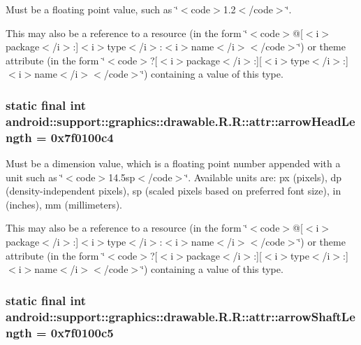 Must be a floating point value, such as \char`\"{}$<$code$>$1.2$<$/code$>$\char`\"{}. 

This may also be a reference to a resource (in the form \char`\"{}$<$code$>$@\mbox{[}$<$i$>$package$<$/i$>$:\mbox{]}$<$i$>$type$<$/i$>$:$<$i$>$name$<$/i$>$$<$/code$>$\char`\"{}) or theme attribute (in the form \char`\"{}$<$code$>$?\mbox{[}$<$i$>$package$<$/i$>$:\mbox{]}\mbox{[}$<$i$>$type$<$/i$>$:\mbox{]}$<$i$>$name$<$/i$>$$<$/code$>$\char`\"{}) containing a value of this type. \hypertarget{classandroid_1_1support_1_1graphics_1_1drawable_1_1_r_1_1attr_912f6e8dee2f755d60ae860052f1de0b}{
\subsubsection[{arrowHeadLength}]{\setlength{\rightskip}{0pt plus 5cm}static final int android::support::graphics::drawable.R.R::attr::arrowHeadLength = 0x7f0100c4}}
\label{classandroid_1_1support_1_1graphics_1_1drawable_1_1_r_1_1attr_912f6e8dee2f755d60ae860052f1de0b}


Must be a dimension value, which is a floating point number appended with a unit such as \char`\"{}$<$code$>$14.5sp$<$/code$>$\char`\"{}. Available units are: px (pixels), dp (density-independent pixels), sp (scaled pixels based on preferred font size), in (inches), mm (millimeters). 

This may also be a reference to a resource (in the form \char`\"{}$<$code$>$@\mbox{[}$<$i$>$package$<$/i$>$:\mbox{]}$<$i$>$type$<$/i$>$:$<$i$>$name$<$/i$>$$<$/code$>$\char`\"{}) or theme attribute (in the form \char`\"{}$<$code$>$?\mbox{[}$<$i$>$package$<$/i$>$:\mbox{]}\mbox{[}$<$i$>$type$<$/i$>$:\mbox{]}$<$i$>$name$<$/i$>$$<$/code$>$\char`\"{}) containing a value of this type. \hypertarget{classandroid_1_1support_1_1graphics_1_1drawable_1_1_r_1_1attr_f7a8bbc7d9f30ed464b0ca15d5ff00a6}{
\subsubsection[{arrowShaftLength}]{\setlength{\rightskip}{0pt plus 5cm}static final int android::support::graphics::drawable.R.R::attr::arrowShaftLength = 0x7f0100c5}}
\label{classandroid_1_1support_1_1graphics_1_1drawable_1_1_r_1_1attr_f7a8bbc7d9f30ed464b0ca15d5ff00a6}


